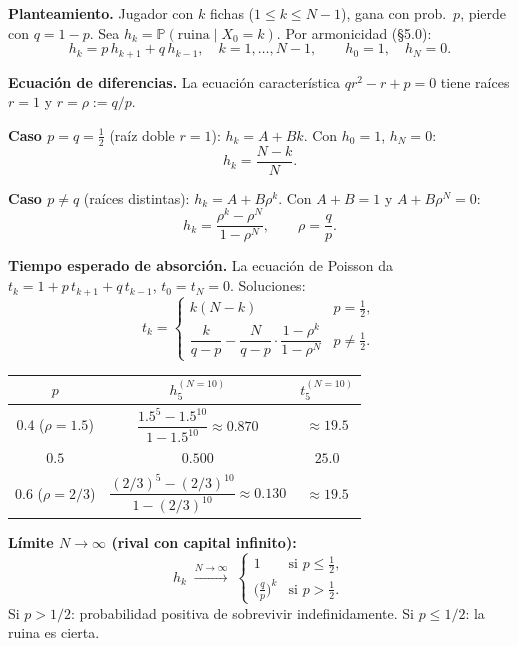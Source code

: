 \documentclass[10pt,a4paper]{article}
\numberwithin{equation}{section}
\newcommand{\Prob}[1]{\mathbb{P}\!\left(#1\right)}
\newcounter{excount}[section]
\renewcommand{\theexcount}{\thesection.\arabic{excount}}
\newenvironment{ejemplo}[1]{%
  \refstepcounter{excount}%
  \begin{tcolorbox}[exbox, title={Ejemplo \theexcount\ \textperiodcentered\ #1}]%
}{\end{tcolorbox}}
\begin{document}
\begin{ejemplo}{Ruina del apostador con probabilidad $p$ arbitraria}
  \textbf{Planteamiento.} Jugador con $k$ fichas ($1\le k\le N-1$), gana con prob.\ $p$,
  pierde con $q=1-p$. Sea $h_k=\Prob{\text{ruina}\mid X_0=k}$.
  Por armonicidad (\S5.0):
  \[
    h_k = p\,h_{k+1}+q\,h_{k-1}, \quad k=1,\ldots,N-1,
    \qquad h_0=1,\quad h_N=0.
  \]

  \textbf{Ecuaci\'on de diferencias.} La ecuaci\'on caracter\'istica $q r^2 - r + p=0$
  tiene ra\'ices $r=1$ y $r=\rho:=q/p$.

  \textbf{Caso $p=q=\tfrac{1}{2}$} (ra\'iz doble $r=1$): $h_k=A+Bk$.
  Con $h_0=1$, $h_N=0$:
  \[
    \boxed{h_k = \frac{N-k}{N}.}
  \]

  \textbf{Caso $p\ne q$} (ra\'ices distintas): $h_k=A+B\rho^k$.
  Con $A+B=1$ y $A+B\rho^N=0$:
  \[
    \boxed{h_k = \frac{\rho^k - \rho^N}{1-\rho^N},\qquad \rho=\frac{q}{p}.}
  \]

  \textbf{Tiempo esperado de absorci\'on.} La ecuaci\'on de Poisson da $t_k=1+p\,t_{k+1}+q\,t_{k-1}$,
  $t_0=t_N=0$. Soluciones:
  \[
    t_k = \begin{cases}
      k(N-k) & p=\tfrac{1}{2},\\[4pt]
      \dfrac{k}{q-p} - \dfrac{N}{q-p}\cdot\dfrac{1-\rho^k}{1-\rho^N} & p\ne\tfrac{1}{2}.
    \end{cases}
  \]

  \begin{center}
    \renewcommand{\arraystretch}{1.3}
    \begin{tabular}{@{}c c c@{}}
      \toprule
      $p$ & $h_5^{(N=10)}$ & $t_5^{(N=10)}$\\
      \midrule
      $0.4$ ($\rho=1.5$) & $\dfrac{1.5^5-1.5^{10}}{1-1.5^{10}}\approx 0.870$ & $\approx 19.5$ \\[4pt]
      $0.5$ & $0.500$ & $25.0$ \\[4pt]
      $0.6$ ($\rho=2/3$) & $\dfrac{(2/3)^5-(2/3)^{10}}{1-(2/3)^{10}}\approx 0.130$ & $\approx 19.5$ \\
      \bottomrule
    \end{tabular}
  \end{center}

  \textbf{L\'imite $N\to\infty$ (rival con capital infinito):}
  \[
    h_k \;\xrightarrow{N\to\infty}\;
    \begin{cases}
      1 & \text{si } p\le\tfrac{1}{2},\\
      \bigl(\tfrac{q}{p}\bigr)^k & \text{si } p>\tfrac{1}{2}.
    \end{cases}
  \]
  Si $p>1/2$: probabilidad positiva de sobrevivir indefinidamente. Si $p\le1/2$: la ruina es cierta.
\end{ejemplo}
\end{document}
